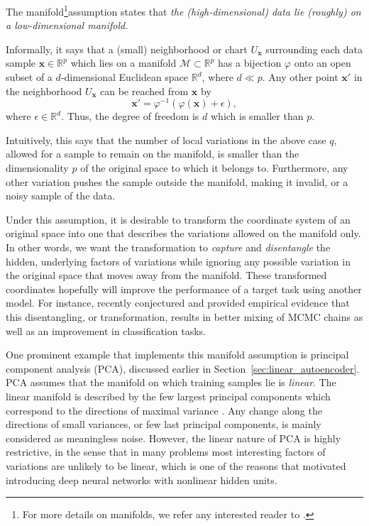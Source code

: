 \documentclass[dissertation,nocontribution,draft*]{aaltoseries}
\newcommand{\vect}[1]{\mathbf{#1}}
\newcommand{\vx}[0]{\vect{x}}
\newcommand{\RR}[0]{\mathbb{R}}
\newcommand{\MM}[0]{\mathcal{M}}
\begin{document}
The manifold\footnote{ For more details on manifolds, we refer any
interested reader to \citep{Absil2008}.}assumption \citep{Chapelle2006} states
that
\textit{
the (high-dimensional) data lie (roughly) on a
low-dimensional manifold.
}

Informally, it says that a (small) neighborhood or chart
$U_\vx$ surrounding each data sample $\vx \in \RR^p$ which
lies on a manifold $\MM \subset \RR^p$ has a bijection
$\varphi$ onto an open subset of a $d$-dimensional Euclidean
space $\RR^d$, where $d \ll p$.
Any other point $\vx'$ in the neighborhood $U_\vx$ can be
reached from $\vx$ by 
\[
\vx' = \varphi^{-1} \left( \varphi(\vx) + \epsilon \right),
\]
where $\epsilon \in \RR^d$. Thus, the degree of freedom is
$d$ which is smaller than $p$.

Intuitively, this says that the number of local variations
in the above case $q$, allowed for a sample to remain 
on the manifold, is smaller than the dimensionality $p$ of
the original space to which it belongs to. Furthermore, any
other variation pushes the sample outside the manifold,
making it invalid, or a noisy sample of the data.

Under this assumption, it is desirable to transform the
coordinate system of an original space into one that
describes the variations allowed on the manifold only. In
other words, we want the transformation to \textit{capture}
and \textit{disentangle} the hidden, underlying factors of
variations \citep{Bengio2009a} while ignoring any possible
variation in the original space that moves away from the
manifold. These transformed coordinates hopefully will
improve the performance of a target task using another
model. For instance, \citet{Bengio2013} recently
conjectured and provided empirical evidence that this
disentangling, or transformation, results in better mixing
of MCMC chains as well as an improvement in classification
tasks.

One prominent example that implements this
manifold assumption is principal component analysis
(PCA), discussed earlier in
Section~\ref{sec:linear_autoencoder}. PCA assumes that
the manifold on which training samples lie is
\textit{linear}. The linear manifold is described by the few
largest principal components which correspond to the
directions of maximal variance \citep[see,
e.g.,][]{Bishop2006}. Any change along the directions of small variances, or
few last principal components, is mainly considered as
meaningless
noise. However, the linear nature of PCA is highly
restrictive, in the sense that in many problems most interesting factors of
variations are unlikely to be linear, which is one of the
reasons that motivated introducing deep neural networks with
nonlinear hidden units.
\end{document}
